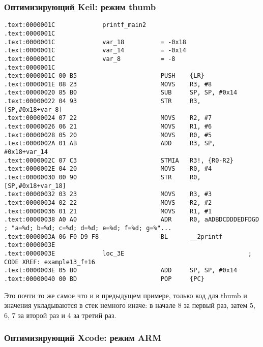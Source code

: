 \subsubsection{Оптимизирующий Keil: режим thumb}

\begin{lstlisting}
.text:0000001C             printf_main2
.text:0000001C
.text:0000001C             var_18          = -0x18
.text:0000001C             var_14          = -0x14
.text:0000001C             var_8           = -8
.text:0000001C
.text:0000001C 00 B5                       PUSH    {LR}
.text:0000001E 08 23                       MOVS    R3, #8
.text:00000020 85 B0                       SUB     SP, SP, #0x14
.text:00000022 04 93                       STR     R3, [SP,#0x18+var_8]
.text:00000024 07 22                       MOVS    R2, #7
.text:00000026 06 21                       MOVS    R1, #6
.text:00000028 05 20                       MOVS    R0, #5
.text:0000002A 01 AB                       ADD     R3, SP, #0x18+var_14
.text:0000002C 07 C3                       STMIA   R3!, {R0-R2}
.text:0000002E 04 20                       MOVS    R0, #4
.text:00000030 00 90                       STR     R0, [SP,#0x18+var_18]
.text:00000032 03 23                       MOVS    R3, #3
.text:00000034 02 22                       MOVS    R2, #2
.text:00000036 01 21                       MOVS    R1, #1
.text:00000038 A0 A0                       ADR     R0, aADBDCDDDEDFDGD ; "a=%d; b=%d; c=%d; d=%d; e=%d; f=%d; g=%"...
.text:0000003A 06 F0 D9 F8                 BL      __2printf
.text:0000003E
.text:0000003E             loc_3E                                  ; CODE XREF: example13_f+16
.text:0000003E 05 B0                       ADD     SP, SP, #0x14
.text:00000040 00 BD                       POP     {PC}
\end{lstlisting}

Это почти то же самое что и в предыдущем примере, только код для thumb и значения укладываются в 
стек немного иначе: в начале 8 за первый раз, затем 5, 6, 7 за второй раз и 4 за третий раз.

\subsubsection{Оптимизирующий Xcode: режим ARM}

